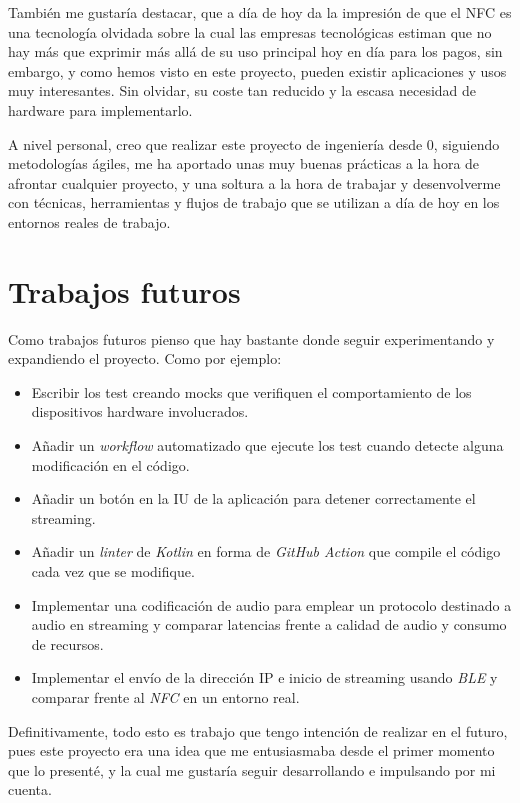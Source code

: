También me gustaría destacar, que a día de hoy da la impresión de que el NFC es
una tecnología olvidada sobre la cual las empresas tecnológicas estiman que no
hay más que exprimir más allá de su uso principal hoy en día para los pagos, sin
embargo, y como hemos visto en este proyecto, pueden existir aplicaciones y usos
muy interesantes. Sin olvidar, su coste tan reducido y la escasa necesidad de
hardware para implementarlo.

A nivel personal, creo que realizar este proyecto de ingeniería desde 0,
siguiendo metodologías ágiles, me ha aportado unas muy buenas prácticas a la
hora de afrontar cualquier proyecto, y una soltura a la hora de trabajar y
desenvolverme con técnicas, herramientas y flujos de trabajo que se utilizan a
día de hoy en los entornos reales de trabajo. 

\section{Trabajos futuros}

Como trabajos futuros pienso que hay bastante donde seguir experimentando y
expandiendo el proyecto. Como por ejemplo:

\begin{itemize}
    \item Escribir los test creando mocks que verifiquen el comportamiento de
    los dispositivos hardware involucrados.
    \item Añadir un \emph{workflow} automatizado que ejecute los test cuando
    detecte alguna modificación en el código.
    \item Añadir un botón en la IU de la aplicación para detener correctamente
    el streaming.
    \item Añadir un \emph{linter} de \emph{Kotlin} en forma de \emph{GitHub
    Action} que compile el código cada vez que se modifique.
    \item Implementar una codificación de audio para emplear un protocolo
    destinado a audio en streaming y comparar latencias frente a calidad de
    audio y consumo de recursos.
    \item Implementar el envío de la dirección IP e inicio de streaming usando
    \emph{BLE} y comparar frente al \emph{NFC} en un entorno real. 
\end{itemize}

Definitivamente, todo esto es trabajo que tengo intención de realizar en el
futuro, pues este proyecto era una idea que me entusiasmaba desde el primer
momento que lo presenté, y la cual me gustaría seguir desarrollando e impulsando
por mi cuenta.